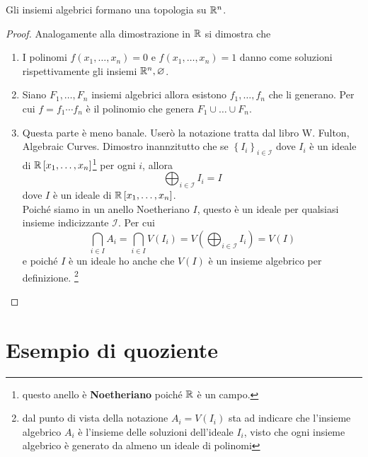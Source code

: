 \begin{theorem}
	Gli insiemi algebrici formano una topologia su $\mathbb{R}^n$.
\end{theorem}
\begin{proof}
	Analogamente alla dimostrazione in $\mathbb{R}$ si dimostra che
	\begin{enumerate}
		\item I polinomi $f(x_1, \dots, x_n) = 0$ e $f(x_1, \dots, x_n) = 1$ danno come soluzioni rispettivamente gli insiemi $\mathbb{R}^n, \varnothing$.
		\item Siano $F_1, \dots, F_n$ insiemi algebrici allora esistono $f_1, \dots, f_n$ che li generano. Per cui $f = f_1 \cdots f_n$ è il polinomio che genera $F_1 \cup \dots \cup F_n$.
		\item Questa parte è meno banale. Userò la notazione tratta dal libro W. Fulton, Algebraic Curves. Dimostro inannzitutto che se $\left\{I_i\right\}_{i \in \mathcal{I}}$ dove $I_i$ è un ideale di $\mathbb{R}\left[x_1, \dots, x_n\right]$\footnote{questo anello è \textbf{Noetheriano} poiché $\mathbb{R}$ è un campo.} per ogni $i$, allora 
		\begin{equation*}
			\bigoplus_{i \in \mathcal{I}} I_i = I
		\end{equation*}
		dove $I$ è un ideale di $\mathbb{R}\left[x_1, \dots, x_n\right]$. \\ Poiché siamo in un anello Noetheriano $I$, questo è un ideale per qualsiasi insieme indicizzante $\mathcal{I}$. 
		Per cui 
		\begin{equation*}
		\bigcap_{i \in I} A_i = \bigcap_{i \in I} V(I_i) = V\left(\bigoplus_{i \in \mathcal{I}} I_i\right) = V(I)
		\end{equation*}
		e poiché $I$ è un ideale ho anche che $V(I)$ è un insieme algebrico per definizione. \footnote{dal punto di vista della notazione $A_i = V(I_i)$ sta ad indicare che l'insieme algebrico $A_i$ è l'insieme delle soluzioni dell'ideale $I_i$, visto che ogni insieme algebrico è generato da almeno un ideale di polinomi}
	\end{enumerate}	
\end{proof}



\section{Esempio di quoziente}

